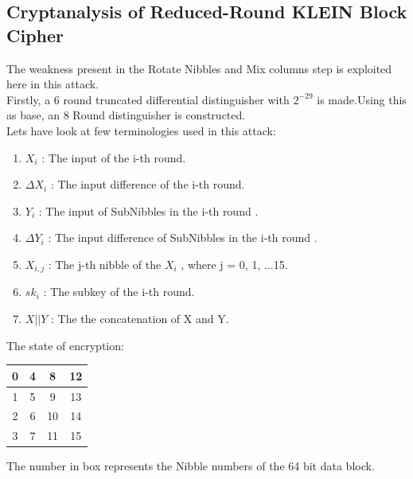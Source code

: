 \documentclass[preprint]{transcrypto}
\begin{document}
\subsection{Cryptanalysis of Reduced-Round KLEIN Block Cipher} \cite{reduced_round}
The weakness present in the Rotate Nibbles and Mix columns step is exploited here in this attack.\\
Firstly, a 6 round truncated differential distinguisher with $2^{-29}$ is made.Using this as base, an 8 Round distinguisher is constructed.\\
Lets have look at few terminologies used in this attack:\\
\begin{enumerate}
    \item $X_{i}$ : The input of the i-th round.
    \item $\Delta X_{i}$ : The input difference of the i-th round.
    \item $Y_{i}$ : The input of SubNibbles in the i-th round .
    \item $\Delta Y_{i}$ : The input difference of SubNibbles in the i-th round .
    \item $X_{i,j}$ : The j-th nibble of the $X_{i}$ , where j = 0, 1, ...15.
    \item $sk_{i}$ : The subkey of the i-th round.
    \item $X || Y$ : The the concatenation of X and Y.
\end{enumerate}
The state of encryption: \\
\begin{center}
\begin{tabular}{|c|c|c|c|}
\hline
0&4&8&12\\
\hline
1&5&9&13\\
\hline
2&6&10&14 \\
\hline
3&7&11&15\\  
\hline
\end{tabular}
\end{center}
The number in box represents the Nibble numbers of the 64 bit data block.
\end{document}
